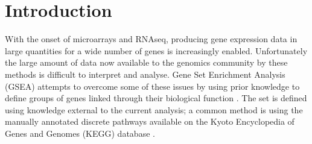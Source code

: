 \documentclass[12pt]{article} %
\begin{document}
%	
	

	\section{Introduction}	

	
	
	With the onset of microarrays and RNAseq, producing gene expression data in large quantities for a wide number of genes is increasingly enabled. Unfortunately the large amount of data now available to the genomics community by these methods is difficult to interpret and analyse. Gene Set Enrichment Analysis (GSEA) attempts to overcome some of these issues by using prior knowledge to define groups of genes linked through their biological function \cite{HejblumTimeCourseGeneSet2015}. The set is defined using knowledge external to the current analysis; a common method is using the manually annotated discrete pathways available on the Kyoto Encyclopedia of Genes and Genomes (KEGG) database \cite{FridleyGenesetanalysis2011}.
	
\end{document}
